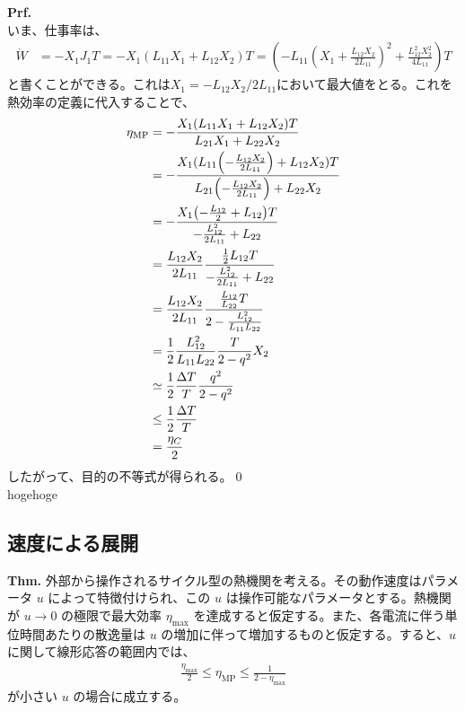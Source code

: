 \documentclass[a4paper,11pt]{jsarticle}
\numberwithin{equation}{section}
\begin{document}
\textbf{Prf.}\\
いま、仕事率は、
\begin{align}
  \dot{W} &= -X_1 J_1 T =-X_1(L_{11} X_1 + L_{12} X_2) T = \left(-L_{11} \left( X_1 + \frac{L_{12} X_2}{2 L_{11}} \right)^2 + \frac{L_{12}^2 X_2^2}{4 L_{11}} \right) T
\end{align}
と書くことができる。これは$X_1 = -L_{12} X_2 / 2 L_{11}$において最大値をとる。これを熱効率の定義に代入することで、
\begin{align}
  \eta_{\text{MP}} &= -\frac{X_1(L_{11} X_1 + L_{12} X_2) T}{L_{21} X_1 + L_{22} X_2} \\
  &= -\frac{X_1(L_{11}\qty(-\frac{L_{12} X_2}{2 L_{11}}) + L_{12} X_2) T}{L_{21} \qty(-\frac{L_{12} X_2}{2 L_{11}}) + L_{22} X_2} \\
  &= -\frac{X_1\qty(-\frac{L_{12}}{2}+ L_{12})T}{-\frac{L_{12}^2}{2L_{11}} + L_{22}} \\
  &= \frac{L_{12} X_2}{2 L_{11} }\frac{\frac{1}{2}L_{12}T}{-\frac{L_{12}^2}{2L_{11}} + L_{22}} \\
  &= \frac{L_{12} X_2}{2 L_{11} }\frac{\frac{L_{12}}{L_{22}}T}{2-\frac{L_{12}^2}{L_{11}L_{22}} } \\
  &= \frac{1}{2} \frac{L_{12}^2}{L_{11}L_{22}} \frac{T}{2-q^2}X_2\\
  &\simeq \frac{1}{2} \frac{\Delta T}{T} \frac{q^2}{2 - q^2} \\
  &\leq \frac{1}{2} \frac{\Delta T}{T}\\
  &= \frac{\eta_C}{2}
\end{align}
したがって、目的の不等式が得られる。\qed\\
hogehoge

\subsection{速度による展開}
\begin{itembox}[l]{\textbf{Thm.}}
外部から操作されるサイクル型の熱機関を考える。その動作速度はパラメータ $u$ によって特徴付けられ、この $u$ は操作可能なパラメータとする。熱機関が $u \to 0$ の極限で最大効率 $\eta_{\text{max}}$ を達成すると仮定する。また、各電流に伴う単位時間あたりの散逸量は $u$ の増加に伴って増加するものと仮定する。すると、$u$ に関して線形応答の範囲内では、
\begin{align}
    \frac{\eta_{\text{max}}}{2} \leq \eta_{\text{MP}} \leq \frac{1}{2 - \eta_{\text{max}}}
\end{align}
が小さい $u$ の場合に成立する。
\end{itembox}
\end{document}

